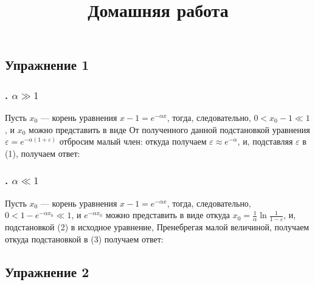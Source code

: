 \documentclass[a4paper, 12pt]{article}
\title{Домашняя работа \textnumero }
\author{}
\date{}
\begin{document}
\maketitle\thispagestyle{fancy}

\subsection*{Упражнение 1}
\subsubsection*{. $\alpha \gg 1$}
Пусть $x_0$ --- корень уравнения $x-1 = e^{-\alpha x}$, тогда,
следовательно, $0 < x_0 - 1 \ll 1$, и $x_0$ можно представить в виде
От полученного данной подстановкой уравнения $\varepsilon = e^{-\alpha(1 + \varepsilon)}$ отбросим малый член:
откуда получаем $\varepsilon \approx e^{-\alpha}$, и, подставляя $\varepsilon$ в (1), получаем ответ:

\subsubsection*{. $\alpha \ll 1$}
Пусть $x_0$ --- корень уравнения $x-1 = e^{-\alpha x}$, тогда,
следовательно, $0 < 1 - e^{-\alpha x_0} \ll 1$, и $e^{-\alpha x_0}$ можно представить в виде
откуда $x_0 = \frac{1}{\alpha}\ln{\frac{1}{1 - \varepsilon}}$, и, подстановкой (2) в исходное уравнение,
Пренебрегая малой величиной, получаем
откуда подстановкой в (3) получаем ответ:

\subsection*{Упражнение 2}
\end{document}
